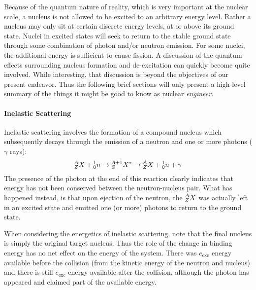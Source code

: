 \documentclass[11pt]{article}
\newcommand\leftidx[3]{{\vphantom{#2}}#1#2#3}
\begin{document}
Because of the quantum nature of reality, which is very important at the nuclear scale, a nucleus is not allowed to be excited to an arbitrary energy level.  Rather a nucleus may only sit at certain discrete energy levels, at or above its ground state.  Nuclei in excited states will seek to return to the stable ground state through some combination of photon and/or neutron emission.  For some nuclei, the additional energy is sufficient to cause fission.  A discussion of the quantum effects surrounding nucleus formation and de-excitation can quickly become quite involved.  While interesting, that discussion is beyond the objectives of our present endeavor.  Thus the following brief sections will only present a high-level summary of the things it might be good to know as nuclear \emph{engineer}.

\paragraph{Inelastic Scattering}
\label{sec:orgheadline4}
Inelastic scattering involves the formation of a compound nucleus which subsequently decays through the emission of a neutron and one or more photons (\(\gamma\) rays):
\begin{align*}
  \leftidx{^A_Z}{X}{} + \leftidx{^1_0}{n}{} 
  \rightarrow \leftidx{^{A+1}_Z}{X}{^*}
  \rightarrow \leftidx{^A_Z}{X}{} + \leftidx{^1_0}{n}{} + \gamma
\end{align*}
The presence of the photon at the end of this reaction clearly indicates that energy has not been conserved between the neutron-nucleus pair.  What has happened instead, is that upon ejection of the neutron, the \(\leftidx{^A_Z}{X}{}\) was actually left in an excited state and emitted one (or more) photons to return to the ground state.

When considering the energetics of inelastic scattering, note that the final nucleus is simply the original target nucleus.  Thus the role of the change in binding energy has no net effect on the energy of the system.  There was \(e_\text{exc}\) energy available before the collision (from the kinetic energy of the neutron and nucleus) and there is still \(e_\text{exc}\) energy available after the collision, although the photon has appeared and claimed part of the available energy.
\end{document}
